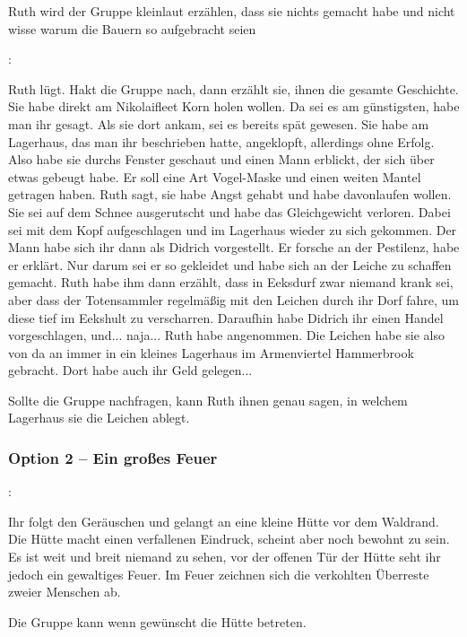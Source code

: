 Ruth wird der Gruppe kleinlaut erzählen, dass sie nichts gemacht habe und nicht wisse warum die Bauern so aufgebracht seien

:

Ruth lügt. Hakt die Gruppe nach, dann erzählt sie, ihnen die gesamte Geschichte. \\
Sie habe direkt am Nikolaifleet Korn holen wollen. Da sei es am günstigsten, habe man ihr gesagt. Als sie dort ankam, sei es bereits spät gewesen. Sie habe am Lagerhaus, das man ihr beschrieben hatte, angeklopft, allerdings ohne Erfolg. Also habe sie durchs Fenster geschaut und einen Mann erblickt, der sich über etwas gebeugt habe. Er soll eine Art Vogel-Maske und einen weiten Mantel getragen haben. Ruth sagt, sie habe Angst gehabt und habe davonlaufen wollen. Sie sei auf dem Schnee ausgerutscht und habe das Gleichgewicht verloren. Dabei sei mit dem Kopf aufgeschlagen und im Lagerhaus wieder zu sich gekommen. Der Mann habe sich ihr dann als Didrich vorgestellt. Er forsche an der Pestilenz, habe er erklärt. Nur darum sei er so gekleidet und habe sich an der Leiche zu schaffen gemacht. Ruth habe ihm dann erzählt, dass in Eeksdurf zwar niemand krank sei, aber dass der Totensammler regelmäßig mit den Leichen durch ihr Dorf fahre, um diese tief im Eekshult zu verscharren. Daraufhin habe Didrich ihr einen Handel vorgeschlagen, und... naja... Ruth habe angenommen. 
Die Leichen habe sie also von da an immer in ein kleines Lagerhaus im Armenviertel Hammerbrook gebracht. Dort habe auch ihr Geld gelegen...

Sollte die Gruppe nachfragen, kann Ruth ihnen genau sagen, in welchem Lagerhaus sie die Leichen ablegt.

\subsubsection{Option 2 – Ein großes Feuer}
\label{feuer}

:

Ihr folgt den Geräuschen und gelangt an eine kleine Hütte vor dem Waldrand. Die Hütte macht einen verfallenen Eindruck, scheint aber noch bewohnt zu sein. Es ist weit und breit niemand zu sehen, vor der offenen Tür der Hütte seht ihr jedoch ein gewaltiges Feuer. Im Feuer zeichnen sich die verkohlten Überreste zweier Menschen ab.

Die Gruppe kann wenn gewünscht die Hütte betreten.

